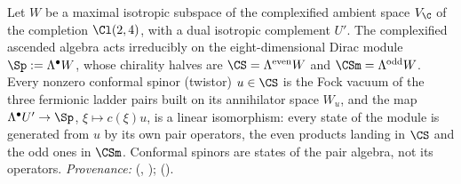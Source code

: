 Let $W$ be a maximal isotropic subspace of the complexified ambient space $V_{\C}$ of the completion $\Cl(2,4)$, with a dual isotropic complement $U'$. The complexified ascended algebra acts irreducibly on the eight-dimensional Dirac module $\Sp := \Lambda^{\bullet}W$, whose chirality halves are $\CS = \Lambda^{\mathrm{even}}W$ and $\CSm = \Lambda^{\mathrm{odd}}W$. Every nonzero conformal spinor (twistor) $u \in \CS$ is the Fock vacuum of the three fermionic ladder pairs built on its annihilator space $W_{u}$, and the map $\Lambda^{\bullet}U' \to \Sp$, $\xi \mapsto c(\xi)u$, is a linear isomorphism: every state of the module is generated from $u$ by its own pair operators, the even products landing in $\CS$ and the odd ones in $\CSm$. Conformal spinors are states of the pair algebra, not its operators. \emph{Provenance:} \cite[Thms.~3.1, 5.3]{ButlerT9} (, ); \cite[Fact~2.2]{ButlerT12} ().
